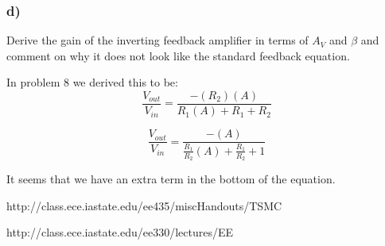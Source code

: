 \documentclass[10pt,a4paper]{article}
\begin{document}
\subsubsection*{d)}
Derive the gain of the inverting feedback amplifier in terms of \(A_V\) and \(\beta\) and
comment on why it does not look like the standard feedback equation.


In problem 8 we derived this to be:
\begin{equation}
\frac{V_{out}}{V_{in}} = \frac{-(R_2)(A)}{R_1(A) + R_1 + R_2}
\end{equation}

\begin{equation}
\frac{V_{out}}{V_{in}} = \frac{-(A)}{\frac{R_1}{R_2}(A) + \frac{R_1}{R_2} + 1}
\end{equation}

It seems that we have an extra term in the bottom of the equation.




http://class.ece.iastate.edu/ee435/miscHandouts/TSMC%

http://class.ece.iastate.edu/ee330/lectures/EE%
\end{document}
